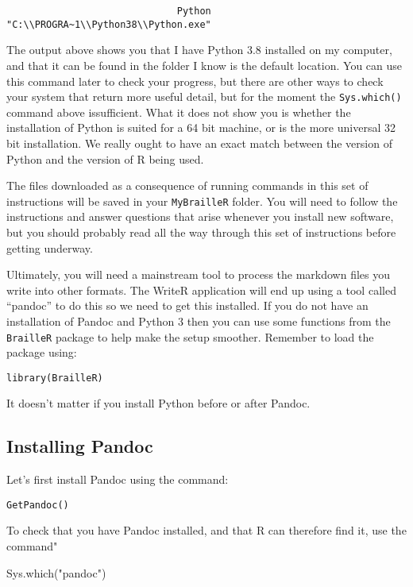 \documentclass[
]{book}
\newenvironment{Shaded}{\begin{snugshade}}{\end{snugshade}}
\newcommand{\FunctionTok}[1]{\textcolor[rgb]{0.00,0.00,0.00}{#1}}
\newcommand{\NormalTok}[1]{#1}
\newcommand{\StringTok}[1]{\textcolor[rgb]{0.31,0.60,0.02}{#1}}
\begin{document}
\begin{verbatim}
                              Python 
"C:\\PROGRA~1\\Python38\\Python.exe" 
\end{verbatim}

The output above shows you that I have Python 3.8 installed on my computer, and that it can be found in the folder I know is the default location. You can use this command later to check your progress, but there are other ways to check your system that return more useful detail, but for the moment the \texttt{Sys.which()} command above issufficient. What it does not show you is whether the installation of Python is suited for a 64 bit machine, or is the more universal 32 bit installation. We really ought to have an exact match between the version of Python and the version of R being used.

The files downloaded as a consequence of running commands in this set of instructions will be saved in your \texttt{MyBrailleR} folder. You will need to follow the instructions and answer questions that arise whenever you install new software, but you should probably read all the way through this set of instructions before getting underway.

Ultimately, you will need a mainstream tool to process the markdown files you write into other formats. The WriteR application will end up using a tool called ``pandoc'' to do this so we need to get this installed.
If you do not have an installation of Pandoc and Python 3 then you can use some functions from the \texttt{BrailleR} package to help make the setup smoother. Remember to load the package using:

\texttt{library(BrailleR)}

It doesn't matter if you install Python before or after Pandoc.

\hypertarget{installing-pandoc}{%
\subsection{Installing Pandoc}\label{installing-pandoc}}

Let's first install Pandoc using the command:

\texttt{GetPandoc()}

To check that you have Pandoc installed, and that R can therefore find it, use the command"

\begin{Shaded}
\begin{Highlighting}[]
\FunctionTok{Sys.which}\NormalTok{(}\StringTok{"pandoc"}\NormalTok{)}
\end{Highlighting}
\end{Shaded}
\end{document}
